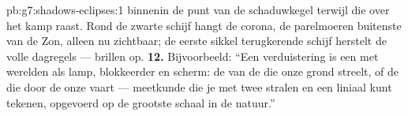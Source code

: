 \begin{solution}{pb:g7:shadows-eclipses:1}
binnenin de punt van de schaduwkegel terwijl die over het kamp raast.
Rond de zwarte schijf hangt de corona, de parelmoeren buitenste
 van de Zon, alleen nu zichtbaar; de eerste sikkel
terugkerende schijf herstelt de volle dagregels --- brillen op.
\textbf{12.} Bijvoorbeeld: ``Een verduistering is een  met
werelden als lamp, blokkeerder en scherm: de  van de
 die onze grond streelt, of de  die door de onze vaart ---
meetkunde die je met twee stralen en een liniaal kunt tekenen,
opgevoerd op de grootste schaal in de natuur.''
\end{solution}
